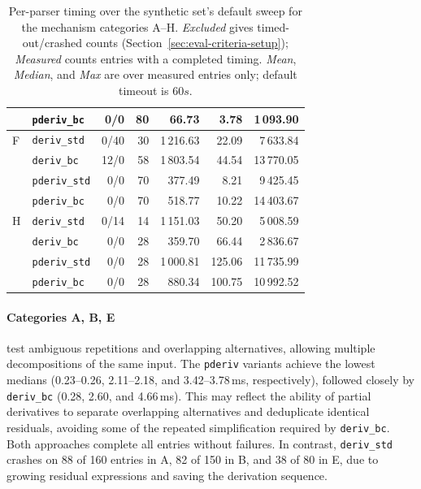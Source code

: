 \begin{table}[H]
\begin{tabular*}{\textwidth}{@{\extracolsep{\fill}} llrrrrr}
  & \texttt{pderiv\_bc}       &  0/0 &  80 &    66.73 &    3.78 &  1\,093.90 \\
\hline
F & \texttt{deriv\_std} &  0/40 &  30 & 1\,216.63 &   22.09 &  7\,633.84 \\
  & \texttt{deriv\_bc}        &  12/0 &  58 & 1\,803.54 &   44.54 & 13\,770.05 \\
  & \texttt{pderiv\_std}      &  0/0 &  70 &   377.49 &    8.21 &  9\,425.45 \\
  & \texttt{pderiv\_bc}       &  0/0 &  70 &   518.77 &   10.22 & 14\,403.67 \\
\hline
H & \texttt{deriv\_std} &  0/14 &  14 & 1\,151.03 &   50.20 &  5\,008.59 \\
  & \texttt{deriv\_bc}        &  0/0 &  28 &   359.70 &   66.44 &  2\,836.67 \\
  & \texttt{pderiv\_std}      &  0/0 &  28 & 1\,000.81 &  125.06 & 11\,735.99 \\
  & \texttt{pderiv\_bc}       &  0/0 &  28 &   880.34 &  100.75 & 10\,992.52 \\
\hline
\end{tabular*}
\caption{Per-parser timing over the synthetic set's default sweep for the
mechanism categories A--H. \emph{Excluded} gives timed-out/crashed
counts (Section~\ref{sec:eval-criteria-setup}); \emph{Measured}
counts entries with a completed timing. \emph{Mean}, \emph{Median}, and
\emph{Max} are over measured entries only; default timeout is $60s$.
}
\label{tab:patho-timing-mech}
\end{table}


\paragraph{Categories A, B, E}
test ambiguous repetitions and overlapping alternatives,
allowing multiple decompositions of the same input.
The \texttt{pderiv} variants achieve the lowest medians
(0.23--0.26, 2.11--2.18, and 3.42--3.78\,ms,
respectively), followed closely by \texttt{deriv\_bc}
(0.28, 2.60, and 4.66\,ms).
This may reflect the ability of partial derivatives
to separate overlapping alternatives and deduplicate
identical residuals, avoiding some of the repeated
simplification required by \texttt{deriv\_bc}.
Both approaches complete all entries without failures.
In contrast, \texttt{deriv\_std} crashes on
88 of 160 entries in A, 82 of 150 in B,
and 38 of 80 in E, due to growing
residual expressions and saving the derivation sequence.

